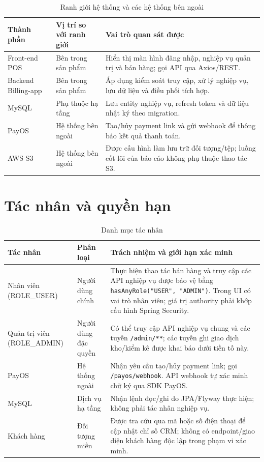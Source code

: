 \documentclass[12pt,a4paper,oneside]{report}
\begin{document}
\begin{table}[htbp]
\centering\small
\caption{Ranh giới hệ thống và các hệ thống bên ngoài}
\begin{tabularx}{\textwidth}{@{}p{3.0cm}p{3.1cm}Y@{}}\toprule
Thành phần & Vị trí so với ranh giới & Vai trò quan sát được\\\midrule
Front-end POS & Bên trong sản phẩm & Hiển thị màn hình đăng nhập, nghiệp vụ quản trị và bán hàng; gọi API qua Axios/REST.\\
Backend Billing-app & Bên trong sản phẩm & Áp dụng kiểm soát truy cập, xử lý nghiệp vụ, lưu dữ liệu và điều phối tích hợp.\\
MySQL & Phụ thuộc hạ tầng & Lưu entity nghiệp vụ, refresh token và dữ liệu nhật ký theo migration.\\
PayOS & Hệ thống bên ngoài & Tạo/hủy payment link và gửi webhook để thông báo kết quả thanh toán.\\
AWS S3 & Hệ thống bên ngoài & Được cấu hình làm lưu trữ đối tượng/tệp; luồng cốt lõi của báo cáo không phụ thuộc thao tác S3.\\
\bottomrule\end{tabularx}
\end{table}




\section{Tác nhân và quyền hạn}
\begin{table}[htbp]
\centering\small
\caption{Danh mục tác nhân}
\begin{tabularx}{\textwidth}{@{}p{2.9cm}p{3.4cm}Y@{}}\toprule
Tác nhân & Phân loại & Trách nhiệm và giới hạn xác minh\\\midrule
Nhân viên (ROLE\_USER) & Người dùng chính & Thực hiện thao tác bán hàng và truy cập các API nghiệp vụ được bảo vệ bằng \texttt{hasAnyRole("USER", "ADMIN")}. Trong UI có vai trò nhân viên; giá trị authority phải khớp cấu hình Spring Security.\\
Quản trị viên (ROLE\_ADMIN) & Người dùng đặc quyền & Có thể truy cập API nghiệp vụ chung và các tuyến \texttt{/admin/**}; các tuyến ghi giao dịch kho/kiểm kê được khai báo dưới tiền tố này.\\
PayOS & Hệ thống ngoài & Nhận yêu cầu tạo/hủy payment link; gọi \texttt{/payos/webhook}. API webhook tự xác minh chữ ký qua SDK PayOS.\\
MySQL & Dịch vụ hạ tầng & Nhận lệnh đọc/ghi do JPA/Flyway thực hiện; không phải tác nhân nghiệp vụ.\\
Khách hàng & Đối tượng miền & Được tra cứu qua mã hoặc số điện thoại để cập nhật chỉ số CRM; không có endpoint/giao diện khách hàng độc lập trong phạm vi xác minh.\\
\bottomrule\end{tabularx}
\end{table}
\end{document}
